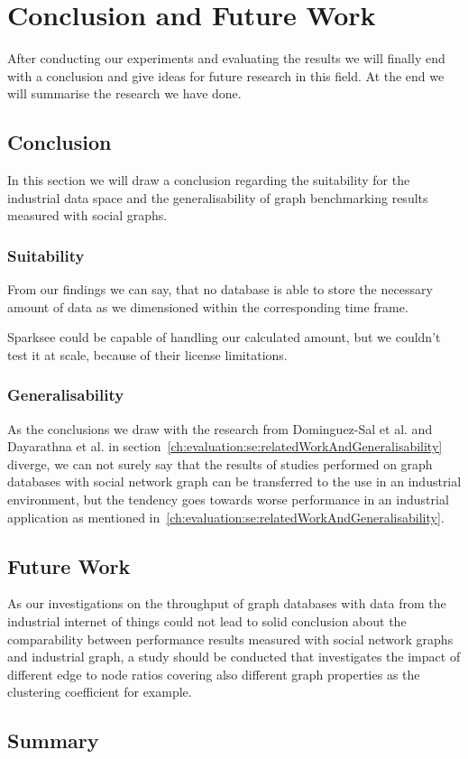 \chapter{Conclusion and Future Work}
\label{ch:futureWork}
After conducting our experiments and evaluating the results we will finally end with a conclusion and give ideas for future research in this field.
At the end we will summarise the research we have done.

\section{Conclusion}
\label{ch:futureWork:se:conclusion}
In this section we will draw a conclusion regarding the suitability for the industrial data space and the generalisability of graph benchmarking results measured with social graphs.

\subsection{Suitability}
From our findings we can say,
that no database is able to store the necessary amount of data as we dimensioned within the corresponding time frame.

Sparksee could be capable of handling our calculated amount,
but we couldn't test it at scale,
because of their license limitations.

\subsection{Generalisability}
As the conclusions we draw with the research from Dominguez-Sal et al.\cite{TaoShen} and Dayarathna et al.\cite{Dayarathna2012} in section~\ref{ch:evaluation:se:relatedWorkAndGeneralisability} diverge,
we can not surely say that the results of studies performed on graph databases with social network graph can be transferred to the use in an industrial environment,
but the tendency goes towards worse performance in an industrial application as mentioned in~\ref{ch:evaluation:se:relatedWorkAndGeneralisability}.

\section{Future Work}
As our investigations on the throughput of graph databases with data from the industrial internet of things could not lead to solid conclusion about the comparability between performance results measured with social network graphs and industrial graph,
a study should be conducted that investigates the impact of different edge to node ratios covering also different graph properties as the clustering coefficient for example.

\section{Summary}
